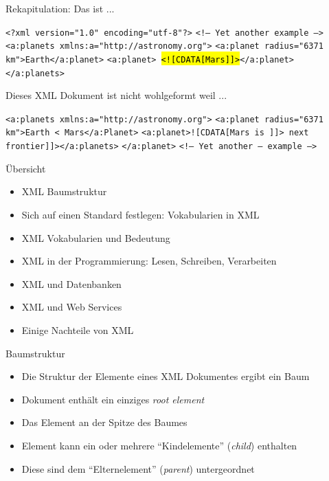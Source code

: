 \documentclass{beamer}
\makeatletter
\newcommand\SoulColor{%
	\let\set@color\beamerorig@set@color
	\let\reset@color\beamerorig@reset@color}
\makeatother
\begin{document}
\begin{frame}{Rekapitulation: Das ist ...}
	
	\texttt{<?xml version="1.0" encoding="utf-8"?>} \newline
	\texttt{<!-- Yet another example -->} \newline
	\texttt{<a:planets xmlns:a="http://astronomy.org">} \newline
	\texttt{<a:planet radius="6371 km">Earth</a:planet>} \newline
	\texttt{<a:planet>\SoulColor\hl{<![CDATA[Mars]]>}</a:planet>} \newline
	\texttt{</a:planets>}
	
\end{frame}

\begin{frame}{Dieses XML Dokument ist nicht wohlgeformt weil ...}
	
	\texttt{<a:planets xmlns:a="http://astronomy.org">} \newline
	\texttt{<a:planet radius="6371 km">Earth < Mars</a:Planet>} \newline
	\texttt{<a:planet>![CDATA[Mars is ]]> next frontier]]></a:planets>} \newline
	\texttt{</a:planet>}
	\texttt{<!-- Yet another -- example -->} \newline
	
\end{frame}

\begin{frame}{Übersicht}
	
	\begin{itemize}
		\item XML Baumstruktur
		\item Sich auf einen Standard festlegen: Vokabularien in XML
		\item XML Vokabularien und Bedeutung
		\item XML in der Programmierung: Lesen, Schreiben, Verarbeiten
		\item XML und Datenbanken
		\item XML und Web Services
		\item Einige Nachteile von XML
	\end{itemize}
	
\end{frame}

\begin{frame}{Baumstruktur}
	
	\begin{itemize}
		\item Die Struktur der Elemente eines XML Dokumentes ergibt ein Baum
		\item Dokument enthält ein einziges \emph{root element}
		\item Das Element an der Spitze des Baumes
		\item Element kann ein oder mehrere ``Kindelemente'' (\emph{child}) enthalten
		\item Diese sind dem ``Elternelement'' (\emph{parent}) untergeordnet
	\end{itemize}
	
\end{frame}
\end{document}
